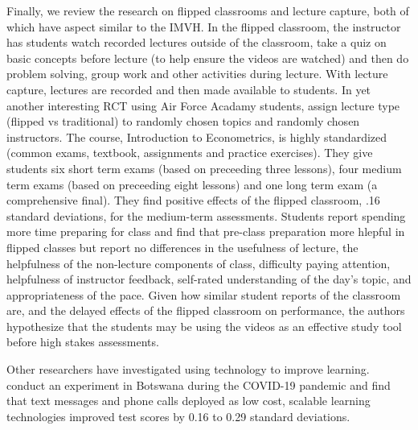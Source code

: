 \documentclass[12pt]{article}
\begin{document}
Finally, we review the research on flipped classrooms and lecture capture, both of which have aspect similar to the IMVH.  In the flipped classroom, the instructor has students watch recorded lectures outside of the classroom, take a quiz on basic concepts before lecture (to help ensure the videos are watched) and then do problem solving, group work and other activities during lecture.  With lecture capture, lectures are recorded and then made available to students.  In yet another interesting RCT using Air Force Acadamy students, \textcite{wbi2018} assign lecture type (flipped vs traditional) to randomly chosen topics and randomly chosen instructors.  The course, Introduction to Econometrics, is highly standardized (common exams, textbook, assignments and practice exercises). They give students six short term exams (based on preceeding three lessons), four medium term exams (based on preceeding eight lessons) and one long term exam (a comprehensive final).  They find positive effects of the flipped classroom, .16 standard deviations, for the medium-term assessments. Students report spending more time preparing for class and find that pre-class preparation more hlepful in flipped classes but report no differences in the usefulness of lecture, the helpfulness of the non-lecture components of class, difficulty paying attention, helpfulness of instructor feedback, self-rated understanding of the day's topic, and appropriateness of the pace. Given how similar student reports of the classroom are, and the delayed effects of the flipped classroom on performance, the authors hypothesize that the students may be using the videos as an effective study tool before high stakes assessments. 


Other researchers have investigated using technology to improve learning. \textcite{abbm2020} conduct an experiment in Botswana during the COVID-19 pandemic and find that text messages and phone calls deployed as low cost, scalable learning technologies improved test scores by 0.16 to 0.29 standard deviations.
\end{document}
